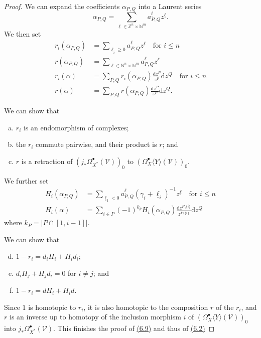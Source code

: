 \documentclass{report}
\renewcommand{\cal}[1]{{\mathcal{#1}}}
\newcommand{\ZZ}{\mathbb{Z}}
\newcommand{\NN}{\mathbb{N}}
\newcommand{\dd}{\mathrm{d}}
\renewcommand{\geq}{\geqslant}
\renewcommand{\leq}{\leqslant}
\begin{document}
\begin{proof}
  We can expand the coefficients $\alpha_{P,Q}$ into a Laurent series
  \[
    \alpha_{P,Q} = \sum_{\underline{\ell}\in\ZZ^n\times\NN^m} a_{P,Q}^{\underline{\ell}} z^{\underline{\ell}}.
  \]
  We then set
  \[
    \begin{aligned}
      r_i(\alpha_{P,Q})
      &= \sum_{\underline{\ell}_i\geq0} a_{P,Q}^{\underline{\ell}} z^{\underline{\ell}}
      \quad\mbox{for $i\leq n$}
    \\r(\alpha_{P,Q})
      &= \sum_{\underline{\ell}\in\NN^n\times\NN^m} a_{P,Q}^{\underline{\ell}} z^{\underline{\ell}}
    \\r_i(\alpha)
      &= \sum_{P,Q} r_i(\alpha_{P,Q})\frac{\dd z^P}{z^P}\dd z^Q
      \quad\mbox{for $i\leq n$}
    \\r(\alpha)
      &= \sum_{P,Q} r(\alpha_{P,Q})\frac{\dd z^P}{z^P}\dd z^Q.
    \end{aligned}
  \]

  We can show that
  \begin{enumerate}[(a)]
    \item $r_i$ is an endomorphism of complexes;
    \item the $r_i$ commute pairwise, and their product is $r$; and
    \item $r$ is a retraction of $(j_*\Omega_{X^*}^\bullet(\cal{V}))_0$ to $(\Omega_X^\bullet\langle Y\rangle(\cal{V}))_0$.
  \end{enumerate}

  We further set
  \[
    \begin{aligned}
      H_i(\alpha_{P,Q})
      &= \sum_{\underline{\ell}_1<0} a_{P,Q}^{\underline{\ell}}(\gamma_i+\underline{\ell}_i)^{-1} z^{\underline{\ell}}
      \quad\mbox{for $i\leq n$}
    \\H_i(\alpha)
      &= \sum_{i\in P} (-1)^{k_p} H_i(\alpha_{P,Q})\frac{\dd z^{P\setminus\{i\}}}{z^{P\setminus\{i\}}}\dd z^Q
    \end{aligned}
  \]
  where $k_P=|P\cap[1,i-1]|$.

  We can show that
  \begin{enumerate}[(a)]
  \setcounter{enumi}{3}
    \item $1-r_i=d_iH_i+H_id_i$;
    \item $d_iH_j+H_jd_i=0$ for $i\neq j$; and
    \item $1-r_i=dH_i+H_id$.
  \end{enumerate}

  Since $1$ is homotopic to $r_i$, it is also homotopic to the composition $r$ of the $r_i$, and $r$ is an inverse up to homotopy of the inclusion morphism $i$ of $(\Omega_X^\bullet\langle Y\rangle(\cal{V}))_0$ into $j_*\Omega_{X^*}^\bullet(\cal{V})$.
  This finishes the proof of \hyperref[II.6.9]{(6.9)} and thus of \hyperref[II.6.2]{(6.2)}
\end{proof}
\end{document}

